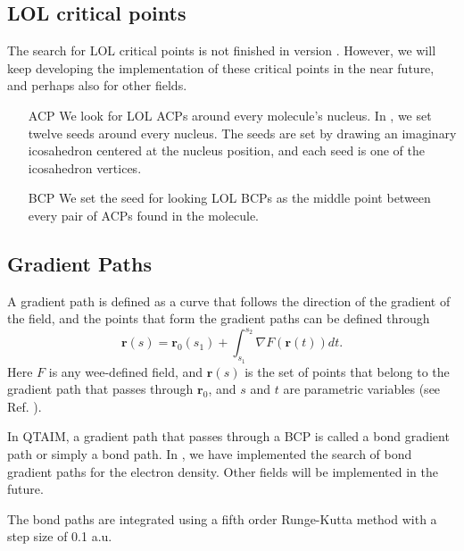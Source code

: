 \subsection{LOL critical points}

The search for LOL critical points is not finished in version \dtkversion. However, we will keep developing the implementation of these critical points in the near future, and perhaps also for other fields.

\begin{itemize}
\item[ACP] We look for LOL ACPs around every molecule's nucleus. In \DTK{} \dtkversion, we set twelve seeds around every nucleus. The seeds are set by drawing an imaginary icosahedron centered at the nucleus position, and each seed is one of the icosahedron vertices.
\item[BCP] We set the seed for looking LOL BCPs as the middle point between every pair of ACPs found in the molecule.
\end{itemize}

\subsection{Gradient Paths}

A gradient path is defined as a curve that follows the direction of the gradient of the field, and the points that form the gradient paths can be defined through
%
\begin{equation}
   \boldsymbol{r}(s)=\boldsymbol{r}_0(s_1)+\int_{s_1}^{s_2}\nabla F(\boldsymbol{r}(t))dt.
\end{equation}
%
Here $F$ is any wee-defined field, and $\boldsymbol{r}(s)$ is the set of points that belong to the gradient path that passes through $\boldsymbol{r}_0$, and $s$ and $t$ are parametric variables (see Ref. \cite{bib:bader1990book}).

In QTAIM, a gradient path that passes through a BCP is called a bond gradient path or simply a bond path. In \DTK{} \dtkversion, we have implemented the search of bond gradient paths for the electron density. Other fields will be implemented in the future.

The bond paths are integrated using a fifth order Runge-Kutta method with a step size of 0.1 a.u.


